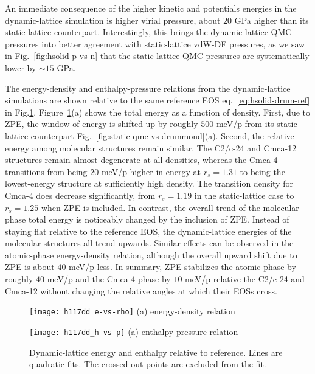 An immediate consequence of the higher kinetic and potentials energies in the dynamic-lattice simulation is higher virial pressure, about $20$ GPa higher than its static-lattice counterpart.
Interestingly, this brings the dynamic-lattice QMC pressures into better agreement with static-lattice vdW-DF pressures, as we saw in Fig.~\ref{fig:hsolid-p-vs-n} that the static-lattice QMC pressures are systematically lower by $\sim 15$ GPa.

The energy-density and enthalpy-pressure relations from the dynamic-lattice simulations are shown relative to the same reference EOS eq.~\ref{eq:hsolid-drum-ref} in Fig.\ref{fig:dynamic-qmc-vs-drummond}.
Figure~\ref{fig:dynamic-qmc-vs-drummond}(a) shows the total energy as a function of density.
First, due to ZPE, the window of energy is shifted up by roughly $500$ meV/p from its static-lattice counterpart Fig.~\ref{fig:static-qmc-vs-drummond}(a).
Second, the relative energy among molecular structures remain similar.
The C2/c-24 and Cmca-12 structures remain almost degenerate at all densities, whereas the Cmca-4 transitions from being $20$ meV/p higher in energy at $r_s=1.31$ to being the lowest-energy structure at sufficiently high density.
The transition density for Cmca-4 does decrease significantly, from $r_s=1.19$ in the static-lattice case to $r_s=1.25$ when ZPE is included.
In contrast, the overall trend of the molecular-phase total energy is noticeably changed by the inclusion of ZPE.
Instead of staying flat relative to the reference EOS, the dynamic-lattice energies of the molecular structures all trend upwards.
Similar effects can be observed in the atomic-phase energy-density relation, although the overall upward shift due to ZPE is about $40$ meV/p less.
In summary, ZPE stabilizes the atomic phase by roughly $40$ meV/p and the Cmca-4 phase by $10$ meV/p relative the C2/c-24 and Cmca-12 without changing the relative angles at which their EOSs cross.

\begin{figure}[h]
	\begin{minipage}{0.49\textwidth}
		\centering
		\texttt{[image: h117dd\_e-vs-rho]}
		(a) energy-density relation
	\end{minipage}
	\begin{minipage}{0.49\textwidth}
		\centering
		\texttt{[image: h117dd\_h-vs-p]}
		(a) enthalpy-pressure relation
	\end{minipage}
	\caption{Dynamic-lattice energy and enthalpy relative to reference. Lines are quadratic fits. The crossed out points are excluded from the fit.}
	\label{fig:dynamic-qmc-vs-drummond}
\end{figure}

